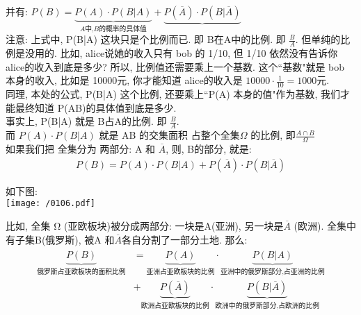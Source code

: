 \documentclass[UTF8]{ctexart}
\begin{document}
	并有: $
	P\left( B \right) =\underset{A\text{中,}B\text{的概率的具体值}}{\underbrace{P\left( A \right) \cdot P\left( B|A \right) }}+\underset{}{\underbrace{P\left( \overline{A} \right) \cdot P\left( B|\overline{A} \right) }}
	$ \\
	
	注意: 上式中,  P(B|A) 这块只是个比例而已. 即 B在A中的比例. 即 $\frac{B} {A}$. 但单纯的比例是没用的. 比如, alice说她的收入只有 bob 的 1/10, 但 1/10 依然没有告诉你 alice的收入到底是多少? 所以, 比例值还需要乘上一个基数. 这个``基数"就是 bob 本身的收入, 比如是 10000元, 你才能知道 alice的收入是 $10000 \cdot \frac{1} {10} = 1000$元. \\
	
	同理, 本处的公式, P(B|A) 这个比例, 还要乘上``P(A) 本身的值"作为基数, 我们才能最终知道 P(AB)的具体值到底是多少. \\
	事实上, P(B|A) 就是 B占A的比例. 即 $\frac{B} {A}$. \\
	而 $P(A) \cdot  P(B|A)$ 就是 AB 的交集面积 占整个全集$\varOmega $ 的比例, 即$	\frac{A\cap B}{\varOmega}	$ \\
	
	如果我们把 全集分为 两部分: A 和 $ \overline{A}$, 则, B的部分, 就是: 
	\begin{align*}  %
		\boxed{
			P(B)= P(A) \cdot P(B |A) +  P( \overline{A}) \cdot P(B | \overline{A})
		}  
	\end{align*}
	
	如下图: \\
	\texttt{[image: /0106.pdf]}
	
	比如, 全集 Ω (亚欧板块)被分成两部分: 一块是A(亚洲), 另一块是$\overline{A}$ (欧洲). 全集中有子集B(俄罗斯), 被A 和$\overline{A}$各自分割了一部分土地. 那么: 
	\begin{align*}  %
		\begin{matrix}
			\underset{\text{俄罗斯占亚欧板块的面积比例}}{\underbrace{P\left( B \right) }}
			&=\underset{\text{亚洲占亚欧板块的比例}}{\underbrace{P\left( A \right) }}\cdot \underset{\text{亚洲中的俄罗斯部分,占亚洲的比例}}{\underbrace{P\left( B|A \right) }}\\
			& +\underset{\text{欧洲占亚欧板块的比例}}{\underbrace{P\left( \overline{A} \right) }}\cdot \underset{\text{欧洲中的俄罗斯部分,占欧洲的比例}}{\underbrace{P\left( B|\overline{A} \right) }}\\
		\end{matrix}
	\end{align*}
	
\end{document}
